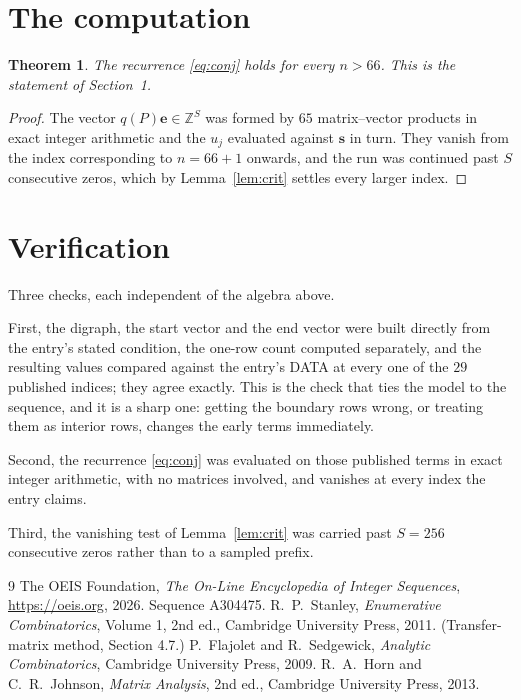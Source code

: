 \documentclass[11pt,a4paper]{article}
\theoremstyle{plain}
\newtheorem{theorem}{Theorem}
\theoremstyle{definition}
\begin{document}
\section{The computation}

\begin{theorem}
The recurrence \eqref{eq:conj} holds for every $n>66$. This is the statement of
Section~1.
\end{theorem}

\begin{proof}
The vector $q(P)\mathbf{e}\in\mathbb{Z}^{S}$ was formed by $65$ matrix--vector
products in exact integer arithmetic and the $u_j$ evaluated against $\mathbf{s}$ in turn.
They vanish from the index corresponding to $n=66+1$ onwards, and the run was continued
past $S$ consecutive zeros, which by Lemma~\ref{lem:crit} settles every larger index.
\end{proof}

\section{Verification}

Three checks, each independent of the algebra above.

First, the digraph, the start vector and the end vector were built directly from the
entry's stated condition, the one-row count computed separately, and the resulting values
compared against the entry's DATA at every one of the $29$ published indices; they
agree exactly. This is the check that ties the model to the sequence, and it is a sharp one:
getting the boundary rows wrong, or treating them as interior rows, changes the early terms
immediately.

Second, the recurrence \eqref{eq:conj} was evaluated on those published terms in exact
integer arithmetic, with no matrices involved, and vanishes at every index the entry claims.

Third, the vanishing test of Lemma~\ref{lem:crit} was carried past $S=256$ consecutive
zeros rather than to a sampled prefix.

\begin{thebibliography}{9}
 The OEIS Foundation, \emph{The On-Line Encyclopedia of Integer
Sequences}, \url{https://oeis.org}, 2026. Sequence A304475.
 R.~P.~Stanley, \emph{Enumerative Combinatorics}, Volume 1, 2nd ed.,
Cambridge University Press, 2011. (Transfer-matrix method, Section 4.7.)
 P.~Flajolet and R.~Sedgewick, \emph{Analytic Combinatorics}, Cambridge
University Press, 2009.
 R.~A.~Horn and C.~R.~Johnson, \emph{Matrix Analysis}, 2nd ed., Cambridge
University Press, 2013.
\end{thebibliography}
\end{document}
